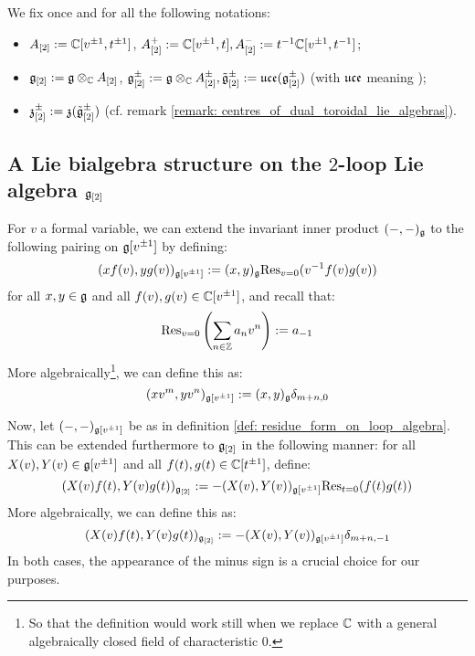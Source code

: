     \begin{convention} \label{conv: multiloop_algebras}
        We fix once and for all the following notations:
        \begin{itemize}
            \item $A_{[2]} := \mathbb{C}[v^{\pm 1}, t^{\pm 1}]$, $A_{[2]}^+ := \mathbb{C}[v^{\pm 1}, t], A_{[2]}^- := t^{-1}\mathbb{C}[v^{\pm 1}, t^{-1}]$;
            \item $\g_{[2]} := \g \tensor_{\bbC} A_{[2]}$, $\g_{[2]}^{\pm} := \g \tensor_{\bbC} A_{[2]}^{\pm}, \tilde{\g}_{[2]}^{\pm} := \uce(\g_{[2]}^{\pm})$ (with $\mathfrak{uce}$ meaning );
            \item $\mathfrak{z}_{[2]}^{\pm} := \mathfrak{z}(\tilde{\mathfrak{g}}_{[2]}^{\pm})$ (cf. remark \ref{remark: centres_of_dual_toroidal_lie_algebras}).
        \end{itemize}
    \end{convention}

    \subsection{A Lie bialgebra structure on the \texorpdfstring{$2$}{}-loop Lie algebra \texorpdfstring{$\mathfrak{g}_{[2]}$}{}}
        \begin{definition} \label{def: residue_form_on_loop_algebra}
            For $v$ a formal variable, we can extend the invariant inner product $(-, -)_{\mathfrak{g}}$ to the following pairing on $\mathfrak{g}[v^{\pm 1}]$ by defining:
                $$(x f(v), y g(v))_{\mathfrak{g}[v^{\pm 1}]} := (x, y)_{\mathfrak{g}} \mathrm{Res}_{v = 0}( v^{-1} f(v) g(v) )$$
            for all $x, y \in \mathfrak{g}$ and all $f(v), g(v) \in \mathbb{C}[v^{\pm 1}]$, and recall that:
                $$\mathrm{Res}_{v = 0}\left( \sum_{n \in \mathbb{Z}} a_n v^n \right) := a_{-1}$$
            More algebraically\footnote{So that the definition would work still when we replace $\mathbb{C}$ with a general algebraically closed field of characteristic $0$.}, we can define this as:
                $$(x v^m, y v^n)_{\mathfrak{g}[v^{\pm 1}]} := (x, y)_{\mathfrak{g}} \delta_{m + n, 0}$$
        \end{definition}
        \begin{definition} \label{def: residue_form_on_multi_loop_algebra}
            Now, let $(-, -)_{\mathfrak{g}[v^{\pm 1}]}$ be as in definition \ref{def: residue_form_on_loop_algebra}. This can be extended furthermore to $\mathfrak{g}_{[2]}$ in the following manner: for all $X(v), Y(v) \in \mathfrak{g}[v^{\pm 1}]$ and all $f(t), g(t) \in \mathbb{C}[t^{\pm 1}]$, define:
                $$(X(v) f(t), Y(v) g(t))_{\mathfrak{g}_{[2]}} := -(X(v), Y(v))_{\mathfrak{g}[v^{\pm 1}]} \mathrm{Res}_{t = 0}( f(t) g(t) )$$
            More algebraically, we can define this as:
                $$(X(v) f(t), Y(v) g(t))_{\mathfrak{g}_{[2]}} := -(X(v), Y(v))_{\mathfrak{g}[v^{\pm 1}]} \delta_{m + n, -1}$$
            In both cases, the appearance of the minus sign is a crucial choice for our purposes. 
        \end{definition}

